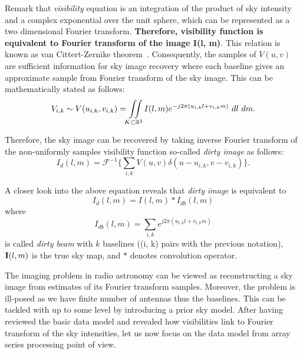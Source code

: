 \documentclass[aoas,preprint]{imsart}
\numberwithin{equation}{section}
\theoremstyle{plain}
\begin{document}
{Remark that {\it{visibility}} equation is an integration of the product of sky intensity and a complex exponential over the unit sphere, which can be represented as a two dimensional Fourier transform. {\bf{Therefore, {{visibility}} function is equivalent to Fourier transform of the image I(l, m\bf )}}. This relation is known as van Cittert-Zernike theorem~\cite{perley1999ra}.  Consequently, the samples of $V(u,v)$ are sufficient information for sky image recovery where each baseline gives an approximate sample from Fourier transform of the sky image. This can be mathematically stated as follows:
\begin{equation}\label{visibility equation}
V_{i,k} \sim V(u_{i,k}, v_{i,k}) = \iint\displaylimits_{K\subset \mathbb{R}^2} {I}(l, m)e^{-j2\pi (u_{i,k}l+v_{i,k}m)}\ dl\ dm.
\end{equation}

Therefore, the sky image can be recovered by taking inverse Fourier transform of the non-uniformly samples visibility function so-called {\it dirty image} as follows:
\begin{equation}
I_d(l, m) = \mathcal{F}^{-1}\Big \{ \sum_{i, k} V(u, v) \delta (u-u_{i,k}, v-v_{i,k}) \Big \}.\label{meas_eq_non_beam}
\end{equation}

A closer look into the above equation reveals that {\it dirty image} is equivalent to
\begin{equation}\label{dirty_image}
I_d(l, m) = I(l, m)\ast I_{db}(l, m) 
\end{equation}
where 
\begin{equation}\label{dirty_beam}
I_{db}(l, m)= \sum_{i, k} e^{j2\pi(u_{i, k}l+v_{i, k}m)}
\end{equation}
is called {\it dirty beam} with $k$ baselines ((i, k) pairs with the previous notation), ${\bf I}(l, m)$ is the true sky map,  and $\ast$ denotes convolution operator.
\vspace{0.5em}

The imaging problem in radio astronomy can be viewed as reconstructing a sky image from estimates of its Fourier transform samples. Moreover, the problem is ill-posed as we have finite number of antennas thus the baselines. This can be tackled with up to some level by introducing a prior sky model. After having reviewed the basic data model and revealed how visibilities link to Fourier transform of the sky intensities, let us now focus on the data model from array series processing point of view. 
 \vspace{0.5em}
 
}
\end{document}
